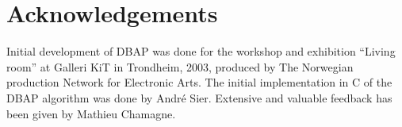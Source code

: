 \documentclass[twoside,10pt]{article}
\begin{document}
\section{Acknowledgements}

Initial development of DBAP was done for the workshop and exhibition ``Living room'' at Galleri KiT in Trondheim, 2003, produced by The Norwegian production Network for Electronic Arts. The initial implementation in C of the DBAP algorithm was done by André Sier. Extensive and valuable feedback has been given by Mathieu Chamagne. 




\end{document}
